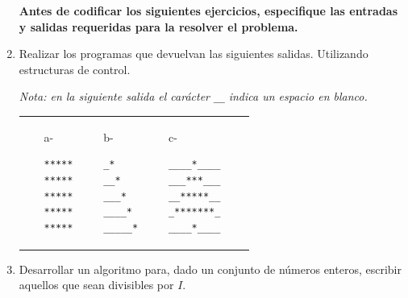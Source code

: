 \documentclass[a4paper,10pt]{article}
\begin{document}
\begin{enumerate}

\item[] \begin{large}\textbf{Antes de codificar los siguientes ejercicios, especifique las entradas y salidas requeridas para la resolver el problema.} \end{large}

\item Realizar los programas que devuelvan las siguientes salidas. Utilizando estructuras de control.
\begin{small} \emph{Nota: en la siguiente salida el car\'acter} \verb=__= \emph{indica un espacio en blanco.}\end{small}

\begin{tabular}{p{} p{} p{}}
    \begin{itemize}
        \item[a-] 
\begin{verbatim} 
*****
*****
*****
*****
*****
\end{verbatim}
    \end{itemize}
&
    \begin{itemize}
        \item[b-] 
\begin{verbatim} 
_*
__*
___*
____*
_____*
\end{verbatim}
    \end{itemize}
&
    \begin{itemize}
        \item[c-] 
\begin{verbatim}
____*____    
___***___   
__*****__  
_*******_ 
____*____    
\end{verbatim}
    \end{itemize}
\\
\end{tabular}

\item Desarrollar un algoritmo para, dado un conjunto de n\'umeros enteros, escribir aquellos que sean divisibles por $I$.


\end{enumerate}
\end{document}
